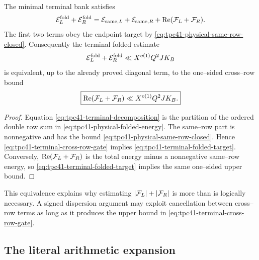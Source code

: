 \begin{theorem}
\label{thm:tpc41-exact-terminal-reduction}
The minimal terminal bank satisfies
\begin{equation}
 \mathcal E_L^{\rm fold}+\mathcal E_R^{\rm fold}
 =\mathcal E_{{\rm same},L}+\mathcal E_{{\rm same},R}
  +\operatorname{Re}(\mathcal F_L+\mathcal F_R).
 \label{eq:tpc41-terminal-decomposition}
\end{equation}
The first two terms obey the endpoint target by
\eqref{eq:tpc41-physical-same-row-closed}.  Consequently the terminal
folded estimate
\begin{equation}
 \mathcal E_L^{\rm fold}+\mathcal E_R^{\rm fold}
 \ll X^{o(1)}Q^2JK_B
 \label{eq:tpc41-terminal-folded-target}
\end{equation}
is equivalent, up to the already proved diagonal term, to the one--sided
cross--row bound
\begin{equation}
 \boxed{
 \operatorname{Re}(\mathcal F_L+\mathcal F_R)
 \ll X^{o(1)}Q^2JK_B.}
 \label{eq:tpc41-terminal-cross-row-gate}
\end{equation}
\end{theorem}

\begin{proof}
Equation \eqref{eq:tpc41-terminal-decomposition} is the partition of the
ordered double row sum in \eqref{eq:tpc41-physical-folded-energy}.  The
same--row part is nonnegative and has the bound
\eqref{eq:tpc41-physical-same-row-closed}.  Hence
\eqref{eq:tpc41-terminal-cross-row-gate} implies
\eqref{eq:tpc41-terminal-folded-target}.  Conversely,
\(\operatorname{Re}(\mathcal F_L+\mathcal F_R)\) is the total energy minus a
nonnegative same--row energy, so \eqref{eq:tpc41-terminal-folded-target}
implies the same one--sided upper bound.
\end{proof}

This equivalence explains why estimating \(|\mathcal F_L|+|\mathcal F_R|\) is more than
is logically necessary.  A signed dispersion argument may exploit
cancellation between cross--row terms as long as it produces the upper
bound in \eqref{eq:tpc41-terminal-cross-row-gate}.

\subsection{The literal arithmetic expansion}

